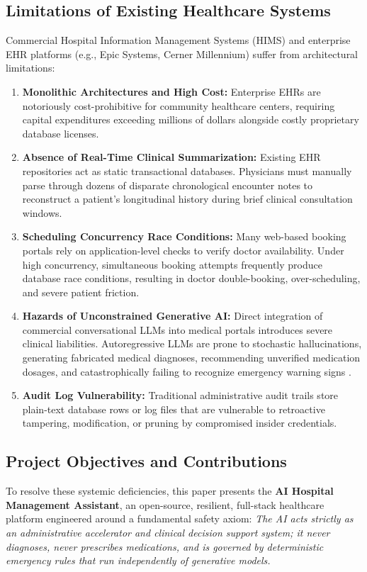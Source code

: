 \documentclass[conference]{IEEEtran}
\begin{document}
\subsection{Limitations of Existing Healthcare Systems}
Commercial Hospital Information Management Systems (HIMS) and enterprise EHR platforms (e.g., Epic Systems, Cerner Millennium) suffer from architectural limitations:
\begin{enumerate}
    \item \textbf{Monolithic Architectures and High Cost:} Enterprise EHRs are notoriously cost-prohibitive for community healthcare centers, requiring capital expenditures exceeding millions of dollars alongside costly proprietary database licenses.
    \item \textbf{Absence of Real-Time Clinical Summarization:} Existing EHR repositories act as static transactional databases. Physicians must manually parse through dozens of disparate chronological encounter notes to reconstruct a patient's longitudinal history during brief clinical consultation windows.
    \item \textbf{Scheduling Concurrency Race Conditions:} Many web-based booking portals rely on application-level checks to verify doctor availability. Under high concurrency, simultaneous booking attempts frequently produce database race conditions, resulting in doctor double-booking, over-scheduling, and severe patient friction.
    \item \textbf{Hazards of Unconstrained Generative AI:} Direct integration of commercial conversational LLMs into medical portals introduces severe clinical liabilities. Autoregressive LLMs are prone to stochastic hallucinations, generating fabricated medical diagnoses, recommending unverified medication dosages, and catastrophically failing to recognize emergency warning signs \cite{singhal2023large}.
    \item \textbf{Audit Log Vulnerability:} Traditional administrative audit trails store plain-text database rows or log files that are vulnerable to retroactive tampering, modification, or pruning by compromised insider credentials.
\end{enumerate}

\subsection{Project Objectives and Contributions}
To resolve these systemic deficiencies, this paper presents the \textbf{AI Hospital Management Assistant}, an open-source, resilient, full-stack healthcare platform engineered around a fundamental safety axiom: \textit{The AI acts strictly as an administrative accelerator and clinical decision support system; it never diagnoses, never prescribes medications, and is governed by deterministic emergency rules that run independently of generative models.}
\end{document}

